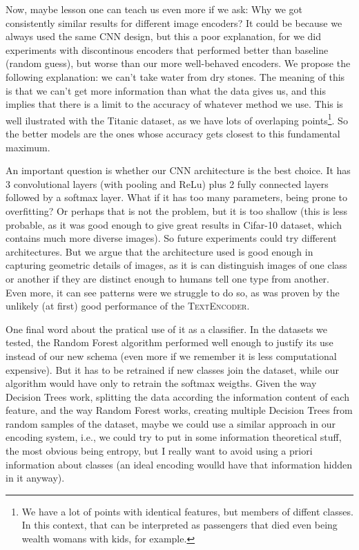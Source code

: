 \documentclass[11pt]{article}
\begin{document}
Now, maybe lesson one can teach us even more if we ask: Why we got consistently similar results for different image encoders? It could be because we always used the same CNN design, but this a poor explanation, for we did experiments with discontinous encoders that performed better than baseline (random guess), but worse than our more well-behaved encoders. We propose the following explanation: we can't take water from dry stones. The meaning of this is that we can't get more information than what the data gives us, and this implies that there is a limit to the accuracy of whatever method we use. This is well ilustrated with the Titanic dataset, as we have lots of overlaping points\footnote{We have a lot of points with identical features, but members of diffent classes. In this context, that can be interpreted as passengers that died even being wealth womans with kids, for example.}. So the better models are the ones whose accuracy gets closest to this fundamental maximum.

An important question is whether our CNN architecture is the best choice. It has 3 convolutional layers (with  pooling and ReLu) plus 2 fully connected layers followed by a softmax layer. What if it has too many parameters, being prone to overfitting? Or perhaps that is not the problem, but it is too shallow (this is less probable, as it was good enough to give great results in Cifar-10 dataset, which contains much more diverse images).
So future experiments could try different architectures. But we argue that the architecture used is good enough in capturing geometric details of images, as it is can distinguish images of one class or another if they are distinct enough to humans tell one type from another. Even more, it can see patterns were we struggle to do so, as was proven by the unlikely (at first) good performance of the \textsc{TextEncoder}.

One final word about the pratical use of it as a classifier. In the datasets we tested, the Random Forest algorithm performed well enough to justify its use instead of our new schema (even more if we remember it is less computational expensive). But it has to be retrained if new classes join the dataset, while our algorithm would have only to retrain the softmax weigths. Given the way Decision Trees work, splitting the data according the information content of each feature, and the way Random Forest works, creating multiple Decision Trees from random samples of the dataset, maybe we could use a similar approach in our encoding system, i.e., we could try to put in some information theoretical stuff, the most obvious being entropy, but I really want to avoid using a priori information about classes (an ideal encoding woulld have that information hidden in it anyway).
\end{document}
